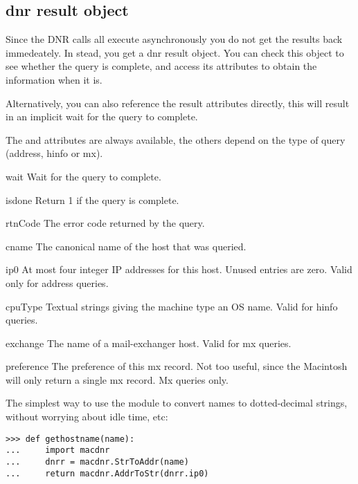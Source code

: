 \subsection{dnr result object}

Since the DNR calls all execute asynchronously you do not get the
results back immedeately. In stead, you get a dnr result object. You
can check this object to see whether the query is complete, and access
its attributes to obtain the information when it is.

Alternatively, you can also reference the result attributes directly,
this will result in an implicit wait for the query to complete.

The  and  attributes are always available, the
others depend on the type of query (address, hinfo or mx).

\renewcommand{\indexsubitem}{(dnr result object method)}

\begin{funcdesc}{wait}{}
Wait for the query to complete.
\end{funcdesc}

\begin{funcdesc}{isdone}{}
Return 1 if the query is complete.
\end{funcdesc}

\begin{datadesc}{rtnCode}
The error code returned by the query.
\end{datadesc}

\begin{datadesc}{cname}
The canonical name of the host that was queried.
\end{datadesc}

\begin{datadesc}{ip0}
At most four integer IP addresses for this host. Unused entries are
zero. Valid only for address queries.
\end{datadesc}

\begin{datadesc}{cpuType}
Textual strings giving the machine type an OS name. Valid for hinfo
queries.
\end{datadesc}

\begin{datadesc}{exchange}
The name of a mail-exchanger host. Valid for mx queries.
\end{datadesc}

\begin{datadesc}{preference}
The preference of this mx record. Not too useful, since the Macintosh
will only return a single mx record. Mx queries only.
\end{datadesc}

The simplest way to use the module to convert names to dotted-decimal
strings, without worrying about idle time, etc:
\begin{verbatim}
>>> def gethostname(name):
...     import macdnr
...     dnrr = macdnr.StrToAddr(name)
...     return macdnr.AddrToStr(dnrr.ip0)
\end{verbatim}
